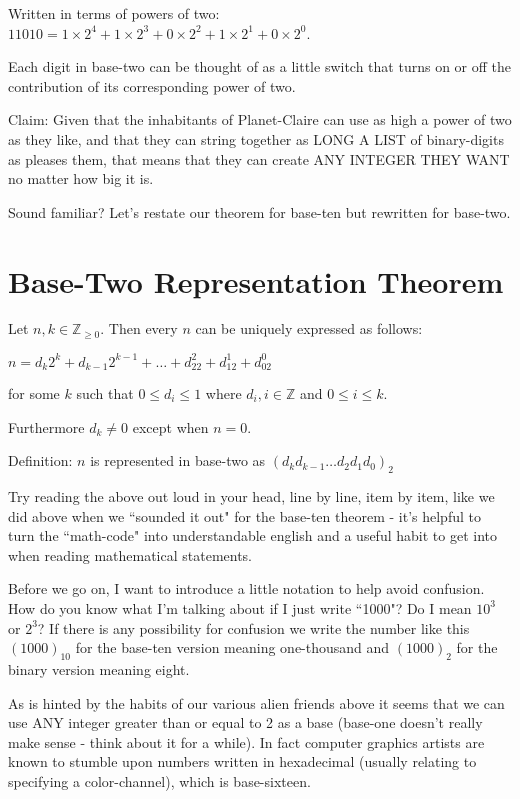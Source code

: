 \documentclass{article}
\newenvironment{jprIn}{\begin{adjustwidth}{2em}{}}{\end{adjustwidth}}
\begin{document}
Written in terms of powers of two: $11010=1\times2^4+1\times2^3+0\times2^2+1\times2^1+0\times2^0$.

Each digit in base-two can be thought of as a little switch that
turns on or off the contribution of its corresponding power of two.

Claim: Given that the inhabitants of Planet-Claire can use as high a power of two as they like,
and that they can string together as LONG A LIST of binary-digits as pleases them,
that means that they can create ANY INTEGER THEY WANT no matter how big it is.

Sound familiar? Let's restate our theorem for base-ten but rewritten for base-two.

\section*{Base-Two Representation Theorem}

\begin{jprIn}
Let $n,k\in \mathbb{Z}_{\ge 0}$. Then every $n$ can be uniquely expressed as follows:

\hspace{3em}$n=d_k2^k+d_{k-1}2^{k-1}+\dots+d_22^2+d_12^1+d_02^0$

for some $k$ such that $0 \le d_i \le 1$ where $d_i,i\in\mathbb{Z}$ and $0 \le i \le k$.

Furthermore $d_k\ne0$ except when $n=0$.

Definition: $n$ is represented in base-two as $(d_kd_{k-1}\dots{}d_2d_1d_0)_2$
\end{jprIn}
\bigskip

Try reading the above out loud in your head,
line by line, item by item, like we did above when
we ``sounded it out" for the base-ten theorem - it's
helpful to turn the ``math-code" into understandable
english and a useful habit to get into when reading mathematical statements.

Before we go on,
I want to introduce a little notation to help avoid confusion.
How do you know what I'm talking about if I just
write ``1000"? Do I mean $10^3$ or $2^3$?
If there is any possibility for confusion we write
the number like this $(1000)_{10}$ 
for the base-ten version meaning one-thousand and $(1000)_2$
for the binary version meaning eight.

As is hinted by the habits of our various alien friends
above it seems that we can use ANY integer greater than
or equal to 2 as a base (base-one doesn't really make
sense - think about it for a while).
In fact computer graphics artists are known
to stumble upon numbers written in hexadecimal (usually relating to specifying a color-channel),
which is base-sixteen.
\end{document}
